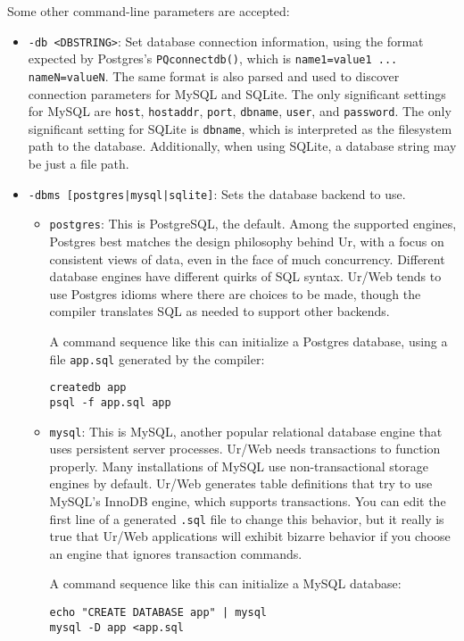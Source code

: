 \documentclass{article}
\begin{document}
Some other command-line parameters are accepted:
\begin{itemize}
\item \texttt{-db <DBSTRING>}: Set database connection information, using the format expected by Postgres's \texttt{PQconnectdb()}, which is \texttt{name1=value1 ... nameN=valueN}.  The same format is also parsed and used to discover connection parameters for MySQL and SQLite.  The only significant settings for MySQL are \texttt{host}, \texttt{hostaddr}, \texttt{port}, \texttt{dbname}, \texttt{user}, and \texttt{password}.  The only significant setting for SQLite is \texttt{dbname}, which is interpreted as the filesystem path to the database.  Additionally, when using SQLite, a database string may be just a file path.

\item \texttt{-dbms [postgres|mysql|sqlite]}: Sets the database backend to use.
  \begin{itemize}
  \item \texttt{postgres}: This is PostgreSQL, the default.  Among the supported engines, Postgres best matches the design philosophy behind Ur, with a focus on consistent views of data, even in the face of much concurrency.  Different database engines have different quirks of SQL syntax.  Ur/Web tends to use Postgres idioms where there are choices to be made, though the compiler translates SQL as needed to support other backends.

    A command sequence like this can initialize a Postgres database, using a file \texttt{app.sql} generated by the compiler:
    \begin{verbatim}
createdb app
psql -f app.sql app
    \end{verbatim}

  \item \texttt{mysql}: This is MySQL, another popular relational database engine that uses persistent server processes.  Ur/Web needs transactions to function properly.  Many installations of MySQL use non-transactional storage engines by default.  Ur/Web generates table definitions that try to use MySQL's InnoDB engine, which supports transactions.  You can edit the first line of a generated \texttt{.sql} file to change this behavior, but it really is true that Ur/Web applications will exhibit bizarre behavior if you choose an engine that ignores transaction commands.

    A command sequence like this can initialize a MySQL database:
    \begin{verbatim}
echo "CREATE DATABASE app" | mysql
mysql -D app <app.sql
    \end{verbatim}


\end{itemize}
\end{itemize}
\end{document}

